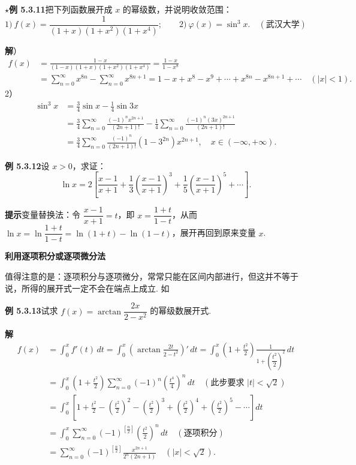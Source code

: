\documentclass[UTF8, 12pt, fontset=fandol, oneside]{ctexart}
\begin{document}
\noindent\(\star\)\textbf{例 5.3.11}\quad 把下列函数展开成 $x$ 的幂级数，并说明收敛范围：
\[
  1)\ f(x)=\frac1{(1+x)(1+x^2)(1+x^4)};\qquad
  2)\ \varphi(x)=\sin^3x.\quad(\text{武汉大学})
\]

\noindent\textbf{解}）
\[
\begin{aligned}
f(x)
&=\frac{1-x}{(1-x)(1+x)(1+x^2)(1+x^4)}
=\frac{1-x}{1-x^8}\\
&=\sum_{n=0}^{\infty}x^{8n}-\sum_{n=0}^{\infty}x^{8n+1}
=1-x+x^8-x^9+\cdots+x^{8n}-x^{8n+1}+\cdots\quad(|x|<1).
\end{aligned}
\]
2）
\[
\begin{aligned}
\sin^3x
&=\frac34\sin x-\frac14\sin3x\\
&=\frac34\sum_{n=0}^{\infty}\frac{(-1)^nx^{2n+1}}{(2n+1)!}
-\frac14\sum_{n=0}^{\infty}\frac{(-1)^n(3x)^{2n+1}}{(2n+1)!}\\
&=\frac34\sum_{n=0}^{\infty}\frac{(-1)^n}{(2n+1)!}\left(1-3^{2n}\right)x^{2n+1},
\quad x\in(-\infty,+\infty).
\end{aligned}
\]

\noindent\textbf{例 5.3.12}\quad 设 $x>0$，求证：
\[
  \ln x=2\left[\frac{x-1}{x+1}+\frac13\left(\frac{x-1}{x+1}\right)^3
  +\frac15\left(\frac{x-1}{x+1}\right)^5+\cdots\right].
\]

\noindent\textbf{提示}\quad 变量替换法：令 $\dfrac{x-1}{x+1}=t$，即
$x=\dfrac{1+t}{1-t}$，从而
$\ln x=\ln\dfrac{1+t}{1-t}=\ln(1+t)-\ln(1-t)$，展开再回到原来变量 $x$.

\noindent\textbf{利用逐项积分或逐项微分法}

值得注意的是：逐项积分与逐项微分，常常只能在区间内部进行，但这并不等于说，所得的展开式一定不会在端点上成立. 如

\noindent\textbf{例 5.3.13}\quad 试求 $f(x)=\arctan\dfrac{2x}{2-x^2}$ 的幂级数展开式.

\noindent\textbf{解}\quad
\[
\begin{aligned}
f(x)
&=\int_0^x f'(t)\,dt
=\int_0^x\left(\arctan\frac{2t}{2-t^2}\right)'\,dt
=\int_0^x\left(1+\frac{t^2}{2}\right)\frac1{1+\left(\dfrac{t^2}{2}\right)^2}\,dt\\
&=\int_0^x\left(1+\frac{t^2}{2}\right)
\sum_{n=0}^{\infty}(-1)^n\left(\frac{t^4}{4}\right)^n\,dt
\quad(\text{此步要求 }|t|<\sqrt2)\\
&=\int_0^x\left[1+\frac{t^2}{2}-\left(\frac{t^2}{2}\right)^2
-\left(\frac{t^2}{2}\right)^3+\left(\frac{t^2}{2}\right)^4
+\left(\frac{t^2}{2}\right)^5-\cdots\right]dt\\
&=\int_0^x\sum_{n=0}^{\infty}(-1)^{\left[\frac n2\right]}
\left(\frac{t^2}{2}\right)^n\,dt\quad(\text{逐项积分})\\
&=\sum_{n=0}^{\infty}(-1)^{\left[\frac n2\right]}
\frac{x^{2n+1}}{2^n(2n+1)}\quad(|x|<\sqrt2).
\end{aligned}
\]
\end{document}
